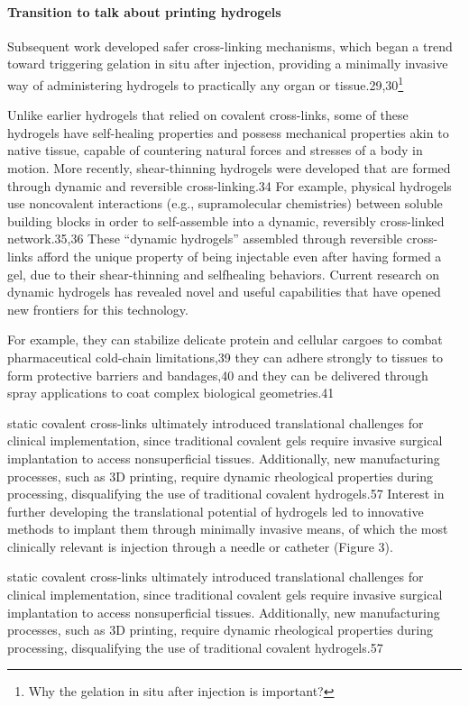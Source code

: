 \paragraph{Transition to talk about printing hydrogels}\citep{correaTranslationalApplicationsHydrogels2021}
Subsequent work developed safer cross-linking mechanisms, which began a trend toward triggering gelation in situ after injection, providing a minimally invasive way of administering  hydrogels to practically any organ or tissue.29,30\footnote{Why the gelation in situ after injection is important?}

Unlike earlier hydrogels that relied on covalent cross-links, some of these hydrogels have self-healing properties and possess mechanical properties akin to native tissue, capable of countering natural forces and stresses of a body in motion.
More recently, shear-thinning hydrogels were developed that are formed through dynamic and reversible cross-linking.34 
For example, physical hydrogels use noncovalent interactions (e.g., supramolecular chemistries) between soluble building blocks in order to self-assemble into a dynamic, reversibly cross-linked  network.35,36 
These “dynamic hydrogels” assembled through reversible cross-links afford the unique property of being injectable even after having formed a gel, due to their shear-thinning and selfhealing behaviors. 
Current research on dynamic hydrogels has revealed novel and useful capabilities that have opened new frontiers for this technology. 

For example, they can stabilize delicate protein and cellular cargoes to combat pharmaceutical  cold-chain limitations,39 they can adhere strongly to tissues to  form protective barriers and bandages,40 and they can be delivered through spray applications to coat complex biological  geometries.41

static covalent cross-links ultimately introduced translational challenges for clinical implementation, since traditional covalent gels require invasive surgical implantation to access nonsuperficial tissues.  
Additionally, new manufacturing processes, such as 3D printing, require dynamic rheological properties during processing, disqualifying the use of traditional covalent  hydrogels.57  
Interest in further developing the translational potential of hydrogels led to innovative methods to implant them through minimally invasive means, of which the most clinically relevant is injection through a needle or catheter (Figure 3).

static covalent cross-links ultimately introduced translational challenges for clinical implementation, since traditional covalent gels require invasive surgical implantation to access nonsuperficial tissues.  
Additionally, new manufacturing processes, such as 3D printing, require dynamic rheological properties during processing, disqualifying the use of traditional covalent  hydrogels.57



